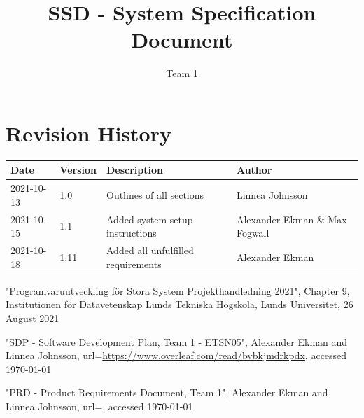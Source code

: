 \documentclass{article}
\title{SSD - System Specification Document}
\author{Team 1}
\begin{document}
\date{}
\maketitle
\thispagestyle{fancy}
\newpage

\section*{Revision History}
\begin{table}[h]
    \centering
    \begin{tabular}{|l|l|p{55mm}|p{35mm}|}
    \hline
    Date & Version & Description & Author \\ 
    \hline\hline 
    2021-10-13 & 1.0 & Outlines of all sections & Linnea Johnsson \\
    \hline
    2021-10-15 & 1.1 & Added system setup instructions & Alexander Ekman \& Max Fogwall  \\
    \hline
    2021-10-18 & 1.11 & Added all unfulfilled requirements & Alexander Ekman \\
    \hline
    \end{tabular}
    \label{tab:history}
\end{table}
\newpage

\begin{thebibliography}{widest entry}

     "Programvaruutveckling för Stora System Projekthandledning 2021", Chapter 9, Institutionen för Datavetenskap Lunds Tekniska Högskola, Lunds Universitet, 26 August 2021
    
     "SDP - Software Development Plan, Team 1 - ETSN05", Alexander Ekman and Linnea Johnsson, url=\url{https://www.overleaf.com/read/bvbkjmdrkpdx}, accessed \today
    
     "PRD - Product Requirements Document, Team 1", Alexander Ekman and Linnea Johnsson, url=\url{}, accessed \today
    
\end{thebibliography}
\newpage

\tableofcontents
\newpage

\end{document}
